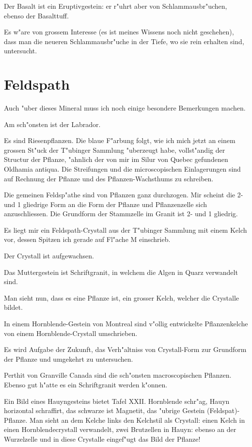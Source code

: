 \documentclass[a4paper, 11pt, oneside, german]{article}
\begin{document}
Der Basalt ist ein Eruptivgestein: er r"uhrt aber von Schlammausbr"uchen, ebenso der Basalttuff.

Es w"are von grossem Interesse (es ist meines Wissens noch nicht geschehen), dass man die neueren Schlammausbr"uche in der Tiefe, wo sie rein erhalten sind, untersucht.
\clearpage
\section{Feldspath}
\paragraph{}
Auch "uber dieses Mineral muss ich noch einige besondere Bemerkungen machen.

Am sch"onsten ist der Labrador.

Es sind Riesenpflanzen. Die blaue F"arbung folgt, wie ich mich jetzt an einem grossen St"uck der T"ubinger Sammlung "uberzeugt habe, vollst"andig der Structur der Pflanze, "ahnlich der von mir im Silur von Quebec gefundenen Oldhamia antiqua. Die Streifungen und die microscopischen Einlagerungen sind auf Rechnung der Pflanze und des Pflanzen-Wachsthums zu schreiben.

Die gemeinen Feldsp"athe sind von Pflanzen ganz durchzogen. Mir scheint die 2- und 1 gliedrige Form an die Form der Pflanze und Pflanzenzelle sich anzuschliessen. Die Grundform der Stammzelle im Granit ist 2- und 1 gliedrig.

Es liegt mir ein Feldspath-Crystall aus der T"ubinger Sammlung mit einem Kelch vor, dessen Spitzen ich gerade auf Fl"ache M einschrieb.

Der Crystall ist aufgewachsen.

Das Muttergestein ist Schriftgranit, in welchem die Algen in Quarz verwandelt sind.

Man sieht nun, dass es eine Pflanze ist, ein grosser Kelch, welcher die Crystalle bildet.

In einem Hornblende-Gestein von Montreal sind v"ollig entwickelte Pflanzenkelche von einem Hornblende-Crystall umschrieben.

Es wird Aufgabe der Zukunft, das Verh"altniss von Crystall-Form zur Grundform der Pflanze und umgekehrt zu untersuchen.

Perthit von Granville Canada sind die sch"onsten macroscopischen Pflanzen. Ebenso gut h"atte es ein Schriftgranit werden k"onnen.

Ein Bild eines Hauyngesteins bietet Tafel XXII. Hornblende schr"ag, Hauyn horizontal schraffirt, das schwarze ist Magnetit, das "ubrige Gestein (Feldspat)-Pflanze. Man sieht an dem Kelche links den Kelchstil als Crystall: einen Kelch in einen Hornblendecrystall verwandelt, zwei Brutzellen in Hauyn: ebenso an der Wurzelzelle und in diese Crystalle eingef"ugt das Bild der Pflanze!
\clearpage
\end{document}
